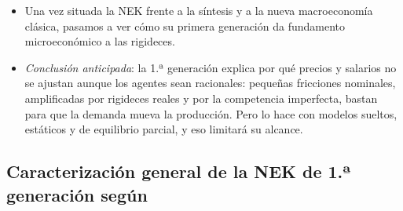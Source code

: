 \documentclass[11pt]{article}
\begin{document}
\begin{itemize}
\item Una vez situada la NEK frente a la síntesis y a la nueva macroeconomía clásica, pasamos a ver cómo su primera generación da fundamento microeconómico a las rigideces.
\item \emph{Conclusión anticipada}: la 1.ª generación explica por qué precios y salarios no se ajustan aunque los agentes sean racionales: pequeñas fricciones nominales, amplificadas por rigideces reales y por la competencia imperfecta, bastan para que la demanda mueva la producción. Pero lo hace con modelos sueltos, estáticos y de equilibrio parcial, y eso limitará su alcance.
\end{itemize}

\subsection{Caracterización general de la NEK de 1.ª generación según }\label{sec:caracterizacion-primera}
\end{document}
